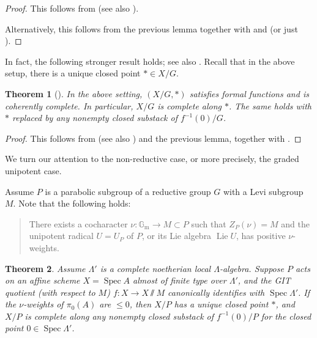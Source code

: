 \documentclass{amsart}
\newtheorem{theorem}{Theorem}[subsection]
\theoremstyle{definition}
\theoremstyle{remark}
\numberwithin{equation}{section}
\DeclareMathOperator{\Lie}{Lie}
\DeclareMathOperator{\Spec}{Spec}
\newcommand{\Gm}{{\mathbb{G}_{\mathrm{m}}}}
\begin{document}
\begin{proof}
This follows from \cite[Theorem 4.2.1, Proposition 4.2.3]{HalpernLeistnerPreygel} (see also \cite[Theorem 2.3.16]{chendhillon}). 

Alternatively, this follows from the previous lemma together with \cite[Theorem 1.1]{GeraschenkoZureickBrown} and \cite[Corollary 4.2]{AlperHallRydhLocal} (or just \cite[(2.1)]{AlperHallRydhLuna}). 
\end{proof}

In fact, the following stronger result holds; see also \cite[Theorem B.4.17]{DottoEmertonGee}. Recall that in the above setup, there is a unique closed point $*\in X/G$. 

\begin{theorem}[{\cite[Theorem 4.5]{AlperHallRydhLocal}}]\label{thm: completeness_along_closedpoint}
In the above setting, $(X/ G, *)$ satisfies formal functions and is coherently complete. In particular, $X/G$ is complete along $*$. The same holds with $*$ replaced by any nonempty closed substack of $f^{-1}(0)/G$. 
\end{theorem}

\begin{proof}
This follows from \cite[Theorem 4.5]{AlperHallRydhLocal} (see also \cite[Theorem 1.3]{AlperHallRydhLuna}) and the previous lemma, together with \cite[Lemma 5.6]{AlperHallLim}. 
\end{proof}

We turn our attention to the non-reductive case, or more precisely, the graded unipotent case. 

Assume $P$ is a parabolic subgroup of a reductive group $G$ with a Levi subgroup $M$. Note that the following holds:
\begin{quotation}
There exists a cocharacter $\nu \colon \Gm\to M\subset P$ such that $Z_P(\nu)=M$ and the unipotent radical $U=U_P$ of $P$, or its Lie algebra $\Lie U$, has positive $\nu$-weights.  
\end{quotation}

\begin{theorem}\label{thm: completeness_along_fiber_parabolic}
Assume $\Lambda'$ is a complete noetherian local $\Lambda$-algebra. Suppose $P$ acts on an affine scheme $X=\Spec A$ almost of finite type over $\Lambda'$, and the GIT quotient (with respect to $M$) $f\colon X\to X\sslash M$ canonically identifies with $\Spec \Lambda'$. If the $\nu$-weights of $\pi_0 (A)$ are $\leq 0$, then $X/P$ has a unique closed point $*$, and $X/P$ is complete along any nonempty closed substack of $f^{-1}(0)/P$ for the closed point $0\in \Spec \Lambda'$. 
\end{theorem}
\end{document}
